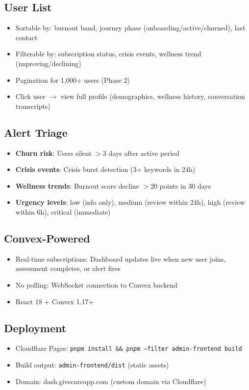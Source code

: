 \documentclass{article}%
\begin{document}
\subsection*{User List}
\begin{itemize}
    \item Sortable by: burnout band, journey phase (onboarding/active/churned), last contact
    \item Filterable by: subscription status, crisis events, wellness trend (improving/declining)
    \item Pagination for 1,000+ users (Phase 2)
    \item Click user $\rightarrow$ view full profile (demographics, wellness history, conversation transcripts)
\end{itemize}

\subsection*{Alert Triage}
\begin{itemize}
    \item \textbf{Churn risk}: Users silent $>$3 days after active period
    \item \textbf{Crisis events}: Crisis burst detection (3+ keywords in 24h)
    \item \textbf{Wellness trends}: Burnout score decline $>$20 points in 30 days
    \item \textbf{Urgency levels}: low (info only), medium (review within 24h), high (review within 6h), critical (immediate)
\end{itemize}

\subsection*{Convex-Powered}
\begin{itemize}
    \item Real-time subscriptions: Dashboard updates live when new user joins, assessment completes, or alert fires
    \item No polling: WebSocket connection to Convex backend
    \item React 18 + Convex 1.17+
\end{itemize}

\subsection*{Deployment}
\begin{itemize}
    \item Cloudflare Pages: \texttt{pnpm install \&\& pnpm --filter admin-frontend build}
    \item Build output: \texttt{admin-frontend/dist} (static assets)
    \item Domain: dash.givecareapp.com (custom domain via Cloudflare)
\end{itemize}
\end{document}
